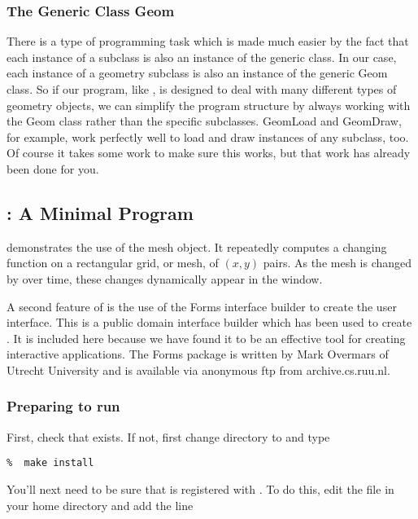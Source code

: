 \subsubsection{The Generic Class Geom}
There is a type of programming task which is made much easier by the fact
that each instance of a subclass is also an instance of
the generic class. In our case, each instance of a geometry subclass is
also an instance of the generic Geom class.
So if our program, like , is designed to
deal with many different types of geometry objects, we can simplify
the program structure by always working with the Geom class rather
than the specific subclasses.  GeomLoad and GeomDraw, for example,
work perfectly well to load and draw instances of any subclass, too.
Of course it takes some work to make sure this works, but that work
has already been done for you.

\subsection{: A Minimal {\OOGL} Program}

demonstrates the use of the mesh {\OOGL} object. 
It repeatedly computes a changing function on a
rectangular grid, or mesh, of $(x,y)$ pairs.  
As the mesh is changed by
 over time, these changes dynamically appear in the
 window.  

A second feature of  is the use of the Forms
interface builder to create the user interface.  This is a public
domain interface builder which has been used to create 
.  It is included here because we have found
it to be an effective tool for creating interactive applications.
The Forms package is written by Mark Overmars of
Utrecht University and is available via anonymous ftp from archive.cs.ruu.nl.

\subsubsection{Preparing to run }

First, check that  exists.
If not, first change directory to 
and type

\begin{verbatim}
%  make install
\end{verbatim}

You'll next need to be sure that  is
registered with .  To do this, edit the
file  in your home directory and add
the line

